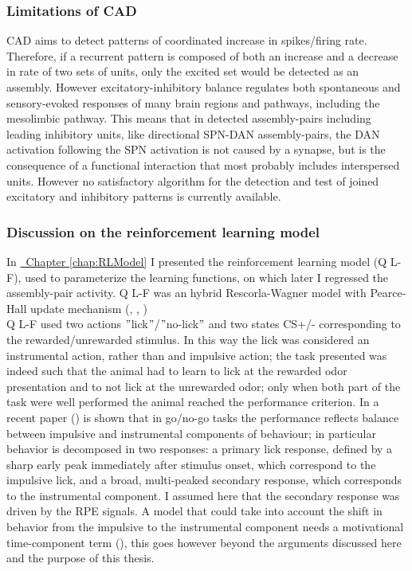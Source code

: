 \subsubsection{Limitations of CAD}
CAD aims to detect patterns of coordinated increase in spikes/firing rate. Therefore, if a recurrent pattern is composed of both an increase and a decrease in rate of two sets of units, only the excited set would be detected as an assembly. However excitatory-inhibitory balance regulates both spontaneous and sensory-evoked responses of many brain regions and pathways, including the mesolimbic pathway. This means that in detected assembly-pairs including leading inhibitory units, like directional SPN-DAN assembly-pairs, the DAN activation following the SPN activation is not caused by a synapse, but is the consequence of a functional interaction that most probably includes interspersed units. However no satisfactory algorithm for the detection and test of joined excitatory and inhibitory patterns is currently available.
\subsubsection{Discussion on the reinforcement learning model}
In \hyperref[chap:RLModel]{~Chapter \ref*{chap:RLModel}} I presented the reinforcement learning model (Q L-F), used to parameterize the learning functions, on which later I regressed the assembly-pair activity. Q L-F was an hybrid Rescorla-Wagner model with Pearce-Hall update mechanism (\cite{Koppe}, \cite{Li}, \cite{Costa})\\Q L-F used two actions $"$lick$"$/$"$no-lick$"$ and two states CS+/- corresponding to the rewarded/unrewarded stimulus. In this way the lick was considered an instrumental action, rather than and impulsive action; the task presented was indeed such that the animal had to learn to lick at the rewarded odor presentation and to not lick at the unrewarded odor; only when both part of the task were well performed the animal  reached the performance criterion. In a recent paper (\cite{SchultzMot}) is shown that in go/no-go tasks the performance reflects balance between impulsive and instrumental components of behaviour; in particular behavior is decomposed in two  responses: a primary lick response, defined by a sharp early peak immediately after stimulus onset, which correspond to the impulsive lick, and a broad, multi-peaked secondary response, which corresponds to the instrumental component. I assumed here that the secondary response was driven by the RPE signals. A model that could take into account the shift in behavior from the impulsive to the instrumental component needs a motivational time-component term (\cite{SchultzMot}), this goes however beyond the arguments discussed here and the purpose of this thesis.
